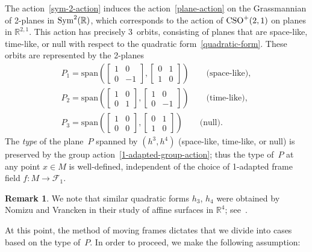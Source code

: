 \documentclass[10pt,a4paper]{amsart}
\numberwithin{equation}{section}
\theoremstyle{definition}
\newtheorem{rmk}[teo]{Remark}
\begin{document}
The action~\eqref{sym-2-action} induces the action~\eqref{plane-action} on the Grassmannian of 2-planes in ${\rm Sym}^2(\mathbb{R})$,
which corresponds to the action of ${\rm CSO}^+(2,1)$ on planes in $\mathbb{R}^{2,1}$.
This action has precisely 3~orbits, consisting of planes that are space-like, time-like, or null with respect to the
quadratic form~\eqref{quadratic-form}.
These orbits are represented by the 2-planes
\begin{gather}
P_1   = \text{span} \left( \begin{bmatrix} 1 & 0 \\  0 & -1 \end{bmatrix}, \begin{bmatrix} 0 & 1 \\  1 & 0 \end{bmatrix} \right)   \qquad   \text{(space-like)}, \nonumber\\
P_2   = \text{span} \left( \begin{bmatrix} 1 & 0 \\  0 & 1 \end{bmatrix}, \begin{bmatrix} 1 & 0 \\  0 & -1 \end{bmatrix} \right)   \qquad   \text{(time-like)}, \nonumber\\
P_3   = \text{span} \left( \begin{bmatrix} 1 & 0 \\  0 & 0 \end{bmatrix}, \begin{bmatrix} 0 & 1 \\  1 & 0 \end{bmatrix} \right)   \qquad    \text{(null)}.
 \label{normal-forms-planes}
\end{gather}
The {\em type} of the plane~$P$ spanned by $(h^3, h^4)$ (space-like, time-like, or null) is preserved by the group
action~\eqref{1-adapted-group-action}; thus the type of~$P$ at any point $x \in M$ is well-def\/ined, independent of the
choice of 1-adapted frame f\/ield $f:M \to \mathcal{F}_1$.

\begin{rmk}
We note that similar quadratic forms $h_3$, $h_4$ were obtained by Nomizu and Vrancken in their study of af\/f\/ine surfaces
in $\mathbb{R}^4$; see~\cite{NV93}.
\end{rmk}

At this point, the method of moving frames dictates that we divide into cases based on the type of~$P$.
In order to proceed, we make the following assumption:
\end{document}
